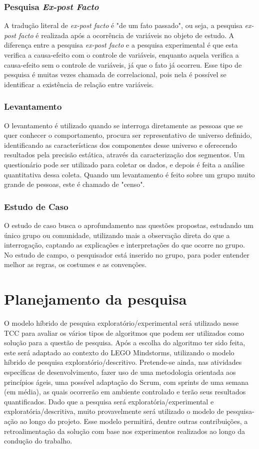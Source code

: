 \subsubsection{Pesquisa \textit{Ex-post Facto}}
	A tradução literal de \textit{ex-post facto} é "de um fato passado", ou seja, a pesquisa \textit{ex-post facto} é realizada após a ocorrência de variáveis no objeto de estudo. A diferença entre a pesquisa \textit{ex-post facto} e a pesquisa experimental é que esta verifica a causa-efeito com o controle de variáveis, enquanto aquela verifica a causa-efeito sem o controle de variáveis, já que o fato já ocorreu. Esse tipo de pesquisa é muitas vezes chamada de correlacional, pois nela é possível se identificar a existência de relação entre variáveis. \cite{ac2002elaborar}
\subsubsection{Levantamento}
	O levantamento é utilizado quando se interroga diretamente as pessoas que se quer conhecer o comportamento, procura ser representativo de universo definido, identificando as características dos componentes desse universo e oferecendo resultados pela precisão estática, através da caracterização dos segmentos. Um questionário pode ser utilizado para coletar os dados, e depois é feita a análise quantitativa dessa coleta. Quando um levantamento é feito sobre um grupo muito grande de pessoas, este é chamado de "censo". \cite{prodanov2013metodologia} 	
\subsubsection{Estudo de Caso}
		O estudo de caso busca o aprofundamento nas questões propostas, estudando um único grupo ou comunidade, utilizando mais a observação direta do que a interrogação, captando as explicações e interpretações do que ocorre no grupo. No estudo de campo, o pesquisador está inserido no grupo, para poder entender melhor as regras, os costumes e as convenções.

\section{Planejamento da pesquisa}
	O modelo híbrido de pesquisa exploratório/experimental será utilizado nesse TCC para avaliar os vários tipos de algoritmos que podem ser utilizados como solução para a questão de pesquisa. Após a escolha do algoritmo ter sido feita, este será adaptado ao contexto do LEGO Mindstorms, utilizando o modelo híbrido de pesquisa exploratório/descritivo.
Pretende-se ainda, nas atividades específicas de desenvolvimento, fazer uso de uma  metodologia orientada aos princípios ágeis, uma possível adaptação do Scrum, com sprints
de uma semana (em média), as quais ocorrerão em ambiente controlado e terão seus resultados quantificados.
	Dado que a pesquisa será exploratória/experimental e exploratória/descritiva, muito provavelmente será utilizado o modelo de pesquisa-ação ao longo do projeto. Esse modelo permitirá, dentre outras contribuições, a retroalimentação da solução com base nos experimentos realizados ao longo da condução do trabalho.

